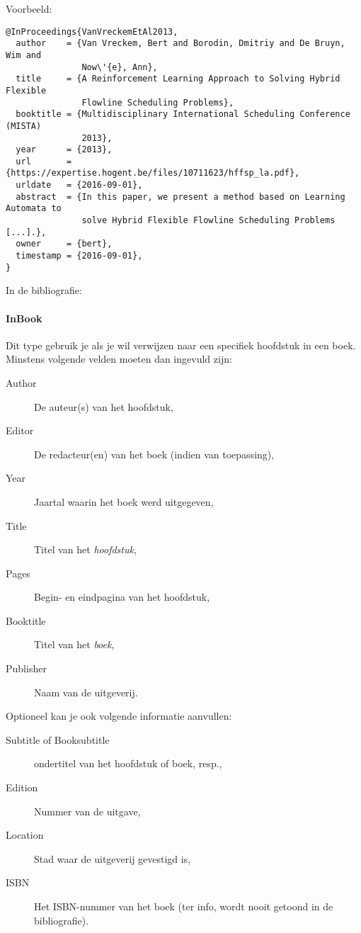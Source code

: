 Voorbeeld:
\begin{verbatim}
@InProceedings{VanVreckemEtAl2013,
  author    = {Van Vreckem, Bert and Borodin, Dmitriy and De Bruyn, Wim and
               Now\'{e}, Ann},
  title     = {A Reinforcement Learning Approach to Solving Hybrid Flexible
               Flowline Scheduling Problems},
  booktitle = {Multidisciplinary International Scheduling Conference (MISTA)
               2013},
  year      = {2013},
  url       = {https://expertise.hogent.be/files/10711623/hffsp_la.pdf},
  urldate   = {2016-09-01},
  abstract  = {In this paper, we present a method based on Learning Automata to
               solve Hybrid Flexible Flowline Scheduling Problems [...].},
  owner     = {bert},
  timestamp = {2016-09-01},
}
\end{verbatim}

In de bibliografie: 

\paragraph{InBook}

Dit type gebruik je als je wil verwijzen naar een specifiek hoofdstuk in een boek. Minstens volgende velden moeten dan ingevuld zijn:

\begin{description}
  \item[Author] De auteur(s) van het hoofdstuk,
  \item[Editor] De redacteur(en) van het boek (indien van toepassing),
  \item[Year] Jaartal waarin het boek werd uitgegeven,
  \item[Title] Titel van het \emph{hoofdstuk},
  \item[Pages] Begin- en eindpagina van het hoofdstuk,
  \item[Booktitle] Titel van het \emph{boek},
  \item[Publisher] Naam van de uitgeverij.
\end{description}

Optioneel kan je ook volgende informatie aanvullen:

\begin{description}
  \item[Subtitle of Booksubtitle] ondertitel van het hoofdstuk of boek, resp.,
  \item[Edition] Nummer van de uitgave,
  \item[Location] Stad waar de uitgeverij gevestigd is,
  \item[ISBN] Het ISBN-nummer van het boek (ter info, wordt nooit getoond in de bibliografie).
\end{description}

